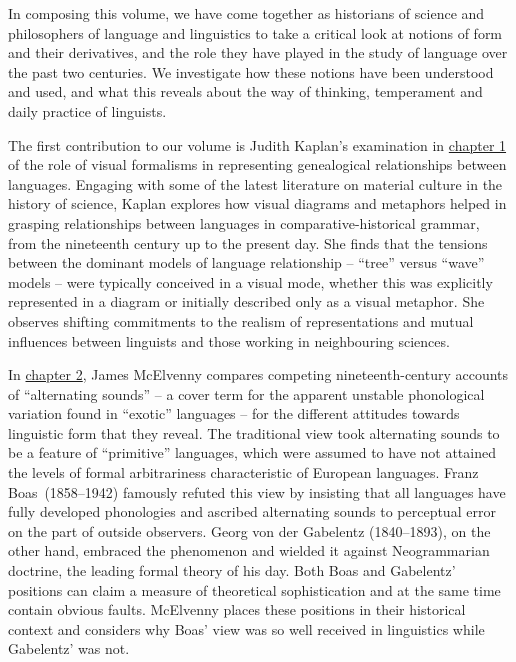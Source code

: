 \documentclass[output=paper]{langscibook}
\begin{document}
In composing this volume, we have come together as historians of science and philosophers of language and linguistics to take a critical look at notions of form and their derivatives, and the role they have played in the study of language over the past two centuries. We investigate how these notions have been understood and used, and what this reveals about the way of thinking, temperament and daily practice of linguists.

The first contribution to our volume is Judith Kaplan's examination in \hyperref[chap:kaplan]{chapter 1} of the role of visual formalisms in representing genealogical relationships between languages. Engaging with some of the latest literature on material culture in the history of science, Kaplan explores how visual diagrams and metaphors helped in grasping relationships between languages in comparative-historical grammar, from the nineteenth century up to the present day. She finds that the tensions between the dominant models of language relationship -- ``tree'' versus ``wave'' models -- were typically conceived in a visual mode, whether this was explicitly represented in a diagram or initially described only as a visual metaphor. She observes shifting commitments to the realism of representations and mutual influences between linguists and those working in neighbouring sciences.

In \hyperref[chap:mcelvenny]{chapter 2}, James McElvenny compares competing nineteenth-century accounts of ``alternating sounds'' -- a cover term for the apparent unstable phonological variation found in ``exotic'' languages -- for the different attitudes towards linguistic form that they reveal. The traditional view took alternating sounds to be a feature of ``primitive'' languages, which were assumed to have not attained the levels of formal arbitrariness characteristic of European languages. Franz Boas~(1858--1942) famously refuted this view by insisting that all languages have fully developed phonologies and ascribed alternating sounds to perceptual error on the part of outside observers. Georg von der Gabelentz (1840--1893), on the other hand, embraced the phenomenon and wielded it against Neogrammarian doctrine, the leading formal theory of his day. Both Boas and Gabelentz' positions can claim a measure of theoretical sophistication and at the same time contain obvious faults. McElvenny places these positions in their historical context and considers why Boas' view was so well received in linguistics while Gabelentz' was not.
\end{document}
